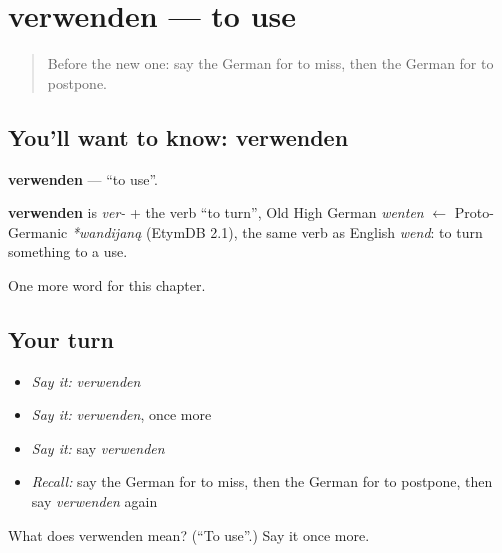 \section[verwenden]{verwenden — to use}

\label{lesson:GE-C190-verwenden}



\begin{quote}
Before the new one: say the German for to miss, then the German for to postpone.
\end{quote}

\subsection*{You'll want to know: verwenden}
\textbf{verwenden} — \textquotedblleft{}to use\textquotedblright{}.

\begin{cousinweb}
\textbf{verwenden} is \emph{ver-} + the verb \textquotedblleft{}to turn\textquotedblright{}, Old High German \emph{wenten} $\leftarrow$ Proto-Germanic \emph{*wandijaną} (EtymDB 2.1), the same verb as English \emph{wend}: to turn something to a use.
\end{cousinweb}

\begin{grammarlens}[title={What you've built}]
One more word for this chapter.
\end{grammarlens}

\subsection*{Your turn}
\begin{itemize}
\raggedright
  \item \emph{Say it:} \emph{verwenden}
  \item \emph{Say it:} \emph{verwenden}, once more
  \item \emph{Say it:} say \emph{verwenden}
  \item \emph{Recall:} say the German for to miss, then the German for to postpone, then say \emph{verwenden} again
\end{itemize}

\begin{tcolorbox}[breakable,colback=teal!4,colframe=teal!35!black,title={Before you move on}]
What does verwenden mean? (\textquotedblleft{}To use\textquotedblright{}.) Say it once more.
\end{tcolorbox}
